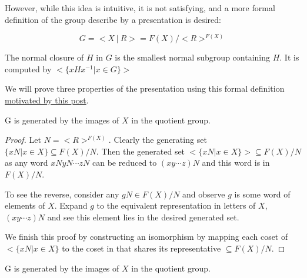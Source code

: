 \documentclass[10pt]{article}
\begin{document}
However, while this idea is intuitive, it is not satisfying, and a more formal
definition of the group describe by a presentation is desired:

\[ G = <X~|~R> = F(X) / <R>^{F(X)} \]

\begin{definition}
	The normal closure of $H$ in $G$ is the smallest normal subgroup containing
	$H$. It is computed by $< \{ xHx^{-1} | x \in G \} >$
\end{definition}

We will prove three properties of the presentation using this formal definition
\href{https://math.stackexchange.com/a/695061/1276086}{motivated by this post}.

\begin{proposition}
	G is generated by the images of $X$ in the quotient group.
\end{proposition}
\begin{proof}
Let $N = <R>^{F(X)}$. Clearly the generating set $\{ xN | x \in X \} \subseteq F(X) / N$. Then the
generated set $< \{ xN | x \in X \} > \subseteq F(X) / N$ as any word
$xNyN \cdots zN$ can be reduced to $(xy \cdots z)N$ and this word is in
$F(X) / N$.

To see the reverse, consider any $gN \in F(X) / N$ and observe $g$ is some word of
elements of $X$. Expand $g$ to the equivalent representation in letters of
$X$, $(xy \cdots z)N$ and see this element lies in the desired generated set.

We finish this proof by constructing an isomorphism by mapping each coset of $<
\{ xN | x \in X \}$ to the coset in that shares its representative $\subseteq
F(X) / N$.
\end{proof}

\begin{proposition}
	G is generated by the images of $X$ in the quotient group.
\end{proposition}

% 
% 
\end{document}
